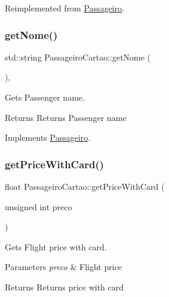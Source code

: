 Reimplemented from \hyperlink{class_passageiro_aa38cf36a9d750417fc0b83781886a852}{Passageiro}.

\mbox{\label{class_passageiro_cartao_a5323cda881d4ed94680f7c4e654a7456}} 
\subsubsection{\texorpdfstring{get\+Nome()}{getNome()}}
{\footnotesize\ttfamily std\+::string Passageiro\+Cartao\+::get\+Nome (\begin{DoxyParamCaption}{ }\end{DoxyParamCaption})\hspace{0.3cm}{\ttfamily [inline]}, {\ttfamily [virtual]}}



Gets Passenger name. 

\begin{DoxyReturn}{Returns}
Returns Passenger name 
\end{DoxyReturn}


Implements \hyperlink{class_passageiro_a1871c2ce0cc1254ffc665a415ec7a815}{Passageiro}.

\mbox{\label{class_passageiro_cartao_a2bd1b79ef18e3289545386a8740b1136}} 
\subsubsection{\texorpdfstring{get\+Price\+With\+Card()}{getPriceWithCard()}}
{\footnotesize\ttfamily float Passageiro\+Cartao\+::get\+Price\+With\+Card (\begin{DoxyParamCaption}\item[{unsigned int}]{preco }\end{DoxyParamCaption})\hspace{0.3cm}{\ttfamily [virtual]}}



Gets Flight price with card. 


\begin{DoxyParams}{Parameters}
{\em preco} & Flight price\\
\hline
\end{DoxyParams}
\begin{DoxyReturn}{Returns}
Returns price with card 
\end{DoxyReturn}


